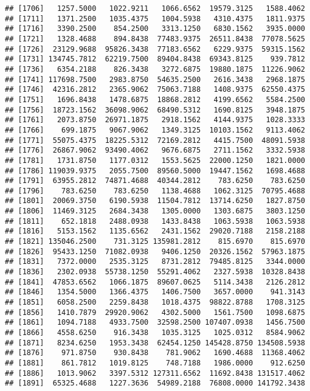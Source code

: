 \documentclass[]{article}
\begin{document}
\begin{verbatim}
## [1706]   1257.5000   1022.9211   1066.6562  19579.3125   1588.4062
## [1711]   1371.2500   1035.4375   1004.5938   4310.4375   1811.9375
## [1716]   3390.2500    854.2500   3313.1250   6830.1562   3935.0000
## [1721]   1328.4688    894.8438  77483.9375  26511.8438  77078.5625
## [1726]  23129.9688  95826.3438  77183.6562   6229.9375  59315.1562
## [1731] 134745.7812  62219.7500  89404.8438  69343.8125    939.7812
## [1736]   6354.2188    826.3438   3272.6875  19880.1875  11226.9062
## [1741] 117698.7500   2983.8750  54635.2500   2616.3438   2968.1875
## [1746]  42316.2812   2365.9062  75063.7188   1408.9375  62550.4375
## [1751]   1696.8438   1478.6875  18868.2812   4199.6562   5584.2500
## [1756]  18723.1562  36098.9062  68490.5312   1690.8125   3948.1875
## [1761]   2073.8750  26971.1875   2918.1562   4144.9375   1028.3333
## [1766]    699.1875   9067.9062   1349.3125  10103.1562   9113.4062
## [1771]  55075.4375  18225.5312  72169.2812   4415.7500  48091.5938
## [1776]  26867.9062  93490.4062   9676.6875   2711.1562   3332.5938
## [1781]   1731.8750   1177.0312   1553.5625  22000.1250   1821.0000
## [1786] 119039.9375   2055.7500  89560.5000  19447.1562   1698.4688
## [1791]  63955.2812  74871.4688  40344.2812    783.6250    783.6250
## [1796]    783.6250    783.6250   1138.4688   1062.3125  70795.4688
## [1801]  20069.3750   6190.5938  11504.7812  13714.6250   1827.8750
## [1806]  11469.3125   2684.3438   1305.0000   1303.6875   3803.1250
## [1811]    652.1818   2488.0938   1433.8438   1063.5938   1063.5938
## [1816]   5153.1562   1135.6562   2431.1562  29020.7188   2158.2188
## [1821] 135046.2500    731.3125 135981.2812    815.6970    815.6970
## [1826]  95433.1250  71082.0938   9406.1250  20326.1562  57963.1875
## [1831]   7372.0000   2535.3125   8731.2812  79485.8125   3344.0000
## [1836]   2302.0938  55738.1250  55291.4062   2327.5938  10328.8438
## [1841]  47853.6562   1066.1875  89607.0625   5114.3438   2126.2812
## [1846]   1354.5000   1366.4375   1406.7500   3657.0000    941.3143
## [1851]   6058.2500   2259.8438   1018.4375  98822.8788   1708.3125
## [1856]   1410.7879  29920.9062   4302.5000   1561.7500   1098.6875
## [1861]   1094.7188   4933.7500  32598.2500 107407.0938   1456.7500
## [1866]   4558.6250    916.3438   1035.3125   1025.0312   8584.9062
## [1871]   8234.6250   1953.3438  62454.1250 145428.8750 134508.5938
## [1876]    971.8750    930.8438    781.9062   1690.4688  11368.4062
## [1881]    861.7812   1019.8125    748.7188   1986.0000    912.6250
## [1886]   1013.9062   3397.5312 127311.6562  11692.8438 131517.4062
## [1891]  65325.4688   1227.3636  54989.2188  76808.0000 141792.3438

\end{verbatim}
\end{document}
